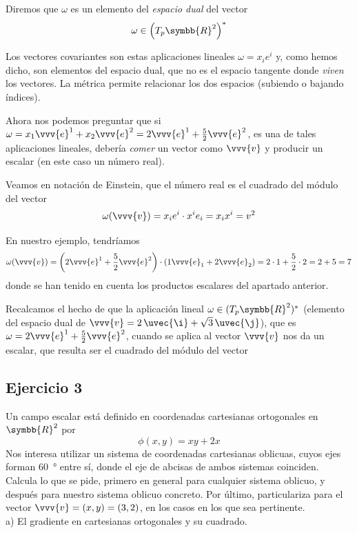 Diremos que $\omega$ es un elemento del \emph{espacio dual} del vector
\[
  \omega \in \left(T_p\symbb{R}^2\right)^*
\]

Los vectores covariantes son estas aplicaciones lineales $\omega = x_ie^i$ y, como hemos
dicho, son elementos del espacio dual, que no es el espacio tangente donde \emph{viven}
los vectores. La métrica permite relacionar los dos espacios (subiendo o bajando índices).

Ahora nos podemos preguntar que si
$\omega = x_1\vvv{e}^1 + x_2\vvv{e}^2 = 2\vvv{e}^1 + \frac{5}{2}\vvv{e}^2$, es una de
tales aplicaciones lineales, debería \emph{comer} un vector como $\vvv{v}$ y producir un
escalar (en este caso un número real).

Veamos en notación de Einstein, que el número real es el cuadrado del módulo del vector
\[
  \omega(\vvv{v}) = x_ie^i\cdot x^ie_i = x_ix^i = v^2
\]

En nuestro ejemplo, tendríamos
\[
  \omega(\vvv{v})
  = \left(2\vvv{e}^1+\dfrac{5}{2}\vvv{e}^2\right)\cdot\left(1\vvv{e}_1+2\vvv{e}_2\right)
  = 2\cdot 1 + \dfrac{5}{2}\cdot 2
  = 2 + 5
  = 7
\]
donde se han tenido en cuenta los productos escalares del apartado anterior.

Recalcamos el hecho de que la aplicación lineal $\omega\in (T_p\symbb{R}^2)^*$
(elemento del espacio dual de $\vvv{v} = 2\,\uvec{\i}+\sqrt{3}\,\uvec{\j}$), que es
$\omega=2\vvv{e}^1+\frac{5}{2}\vvv{e}^2$, cuando se aplica al vector $\vvv{v}$ nos da un
escalar, que resulta ser el cuadrado del módulo del vector


\newpage
\subsection{Ejercicio 3}
Un campo escalar está definido en coordenadas cartesianas ortogonales en $\symbb{R}^2$
por
\[
  \phi(x,y) = xy+2x
\]
Nos interesa utilizar un sistema de coordenadas cartesianas oblicuas, cuyos ejes forman
\qty{60}{\degree} entre sí, donde el eje de abcisas de ambos sistemas coinciden.\\
Calcula lo que se pide, primero en general para cualquier sistema oblicuo, y después
para nuestro sistema oblicuo concreto. Por último, particulariza para el vector
$\vvv{v} = (x,y) = (3,2)$, en los casos en los que sea pertinente.\\
a) El gradiente en cartesianas ortogonales y su cuadrado.\\

